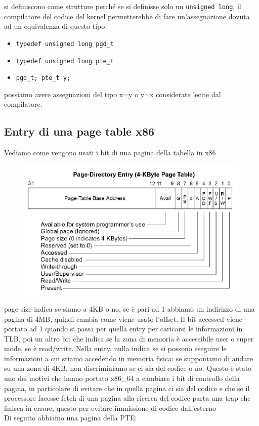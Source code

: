 \documentclass[12pt, oneside]{extbook}
\begin{document}
si definiscono come strutture perché se si definisse solo un \texttt{unsigned long}, il compilatore del codice del kernel permetterebbe di fare un'assegnazione dovuta ad un equivalenza di questo tipo
\begin{itemize}
	\item[] \texttt{typedef unsigned long pgd\_t}
	\item[] \texttt{typedef unsigned long pte\_t}
	\item[] \texttt{pgd\_t; pte\_t y;}
\end{itemize}
possiamo avere assegnazioni del tipo x=y o y=x considerate lecite dal compilatore.
\subsection{Entry di una page table x86}
Vediamo come vengono usati i bit di una pagina della tabella in x86
\begin{figure}[!h]
	\includegraphics[scale=0.4]{immagini/i386_pde_entry.png}
\end{figure}
page size indica se siamo a 4KB o no, se è pari ad 1 abbiamo un indirizzo di una pagina di 4MB, quindi cambia come viene usato l'offset. Il bit accessed viene portato ad 1 quando si passa per quella entry per caricarsi le informazioni in TLB, poi un altro bit che indica se la zona di memoria è accessibile user o super mode, se è read/write. Nella entry, nulla indica se si possono eseguire le informazioni a cui stiamo accedendo in memoria fisica: se supponiamo di andare su una zona di 4KB, non discriminiamo se ci sia del codice o no. Questo è stato uno dei motivi che hanno portato x86\_64 a cambiare i bit di controllo della pagina, in particolare di evitare che in quella pagina ci sia del codice e che se il processore facesse fetch di una pagina alla ricerca del codice parta una trap che finisca in errore, questo per evitare immissione di codice dall'esterno\\ Di seguito abbiamo una pagina della PTE:
\end{document}
